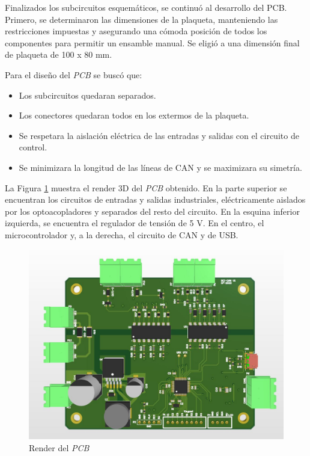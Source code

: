 Finalizados los subcircuitos esquemáticos, se continuó al desarrollo del PCB. Primero, se determinaron las dimensiones de la plaqueta, manteniendo las restricciones impuestas y asegurando una cómoda posición de todos los componentes para permitir un ensamble manual. Se eligió a una dimensión final de plaqueta de 100 x 80 mm. 

Para el diseño del \textit{PCB} se buscó que:
\begin{itemize}
	\item Los subcircuitos quedaran separados.
	\item Los conectores quedaran todos en los extermos de la plaqueta.
	\item Se respetara la aislación eléctrica de las entradas y salidas con el circuito de control.
	\item Se minimizara la longitud de las líneas de CAN y se maximizara su simetría.
\end{itemize}

La Figura \ref{fig:render_pcb} muestra el render 3D del \textit{PCB} obtenido. En la parte superior se encuentran los circuitos de entradas y salidas industriales, eléctricamente aislados por los optoacopladores y separados del resto del circuito. En la esquina inferior izquierda, se encuentra el regulador de tensión de 5 V. En el centro, el microcontrolador y, a la derecha, el circuito de CAN y de USB.

\begin{figure}[htbp]
	\centering
	\includegraphics[scale=.4]{./Figures/pcb_sch.JPG}
	\caption{Render del \textit{PCB}}
	\label{fig:render_pcb}
\end{figure}

